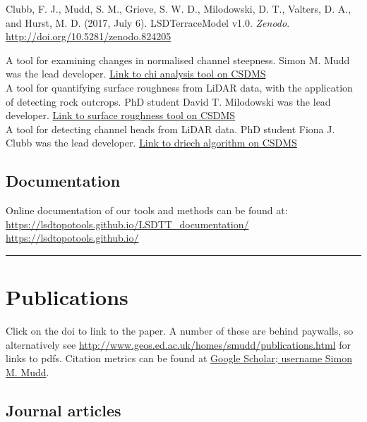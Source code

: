 \documentclass[10pt, a4paper]{article}
\newcommand{\years}[1]{\marginnote{\scriptsize #1}}
\begin{document}
Clubb, F. J., Mudd, S. M., Grieve, S. W. D., Milodowski, D. T., Valters, D. A., and Hurst, M. D. (2017, July 6). LSDTerraceModel v1.0. \textit{Zenodo}.\\ \href{http://doi.org/10.5281/zenodo.824205}{http://doi.org/10.5281/zenodo.824205}\par



\years{CSDMS}A tool for examining changes in normalised channel steepness. Simon M. Mudd was the lead developer. \href{http://csdms.colorado.edu/wiki/Model:Chi_analysis_tools}{Link to chi analysis tool on CSDMS}\\[0.05cm]
A tool for quantifying surface roughness from LiDAR data, with the application of detecting rock outcrops. PhD student David T. Milodowski was the lead developer. \href{http://csdms.colorado.edu/wiki/Model:SurfaceRoughness}{Link to surface roughness tool on CSDMS}\\[0.05cm]
A tool for detecting channel heads from LiDAR data. PhD student Fiona J. Clubb was the lead developer. \href{http://csdms.colorado.edu/wiki/Model:DrEICH_algorithm}{Link to driech algorithm on CSDMS}\\[0.05cm]


\subsection*{Documentation}Online documentation of our tools and methods can be found at:\\[0.05cm]
\url{https://lsdtopotools.github.io/LSDTT_documentation/}\\[0.05cm]
\url{https://lsdtopotools.github.io/}\\[0.05cm]

\hrule
\section*{Publications}
Click on the doi to link to the paper. A number of these are behind paywalls, so alternatively see \href{http://www.geos.ed.ac.uk/homes/smudd/publications.html}{http://www.geos.ed.ac.uk/homes/smudd/publications.html} for links to pdfs. Citation metrics can be found at \href{http://scholar.google.com/citations?user=9iv6l7wAAAAJ\&hl=en}{Google Scholar; username Simon M. Mudd}. 

\subsection*{Journal articles}
\end{document}
